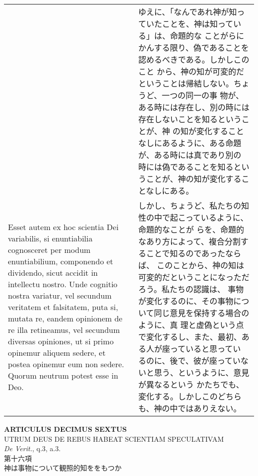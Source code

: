 \documentclass[10pt]{jsarticle} %
\begin{document}
\begin{longtable}{p{21em}p{21em}}
&

ゆえに、「なんであれ神が知っていたことを、神は知っている」は、命題的な
ことがらにかんする限り、偽であることを認めるべきである。しかしこのこと
から、神の知が可変的だということは帰結しない。ちょうど、一つの同一の事
物が、ある時には存在し、別の時には存在しないことを知るということが、神
の知が変化することなしにあるように、ある命題が、ある時には真であり別の
時には偽であることを知るということが、神の知が変化することなしにある。

\\


Esset autem ex hoc scientia Dei variabilis, si enuntiabilia
cognosceret per modum enuntiabilium, componendo et dividendo, sicut
accidit in intellectu nostro. Unde cognitio nostra variatur, vel
secundum veritatem et falsitatem, puta si, mutata re, eandem opinionem
de re illa retineamus, vel secundum diversas opiniones, ut si primo
opinemur aliquem sedere, et postea opinemur eum non sedere. Quorum
neutrum potest esse in Deo.

&

しかし、ちょうど、私たちの知性の中で起こっているように、命題的なことが
らを、命題的なあり方によって、複合分割することで知るのであったならば、
このことから、神の知は可変的だということになっただろう。私たちの認識は、
事物が変化するのに、その事物について同じ意見を保持する場合のように、真
理と虚偽という点で変化するし、また、最初、ある人が座っていると思ってい
るのに、後で、彼が座っていないと思う、というように、意見が異なるという
かたちでも、変化する。しかしこのどちらも、神の中ではありえない。


\end{longtable}
\newpage




\begin{center}
{\Large {\bf ARTICULUS DECIMUS SEXTUS}}\\ {\large UTRUM DEUS DE REBUS
HABEAT SCIENTIAM SPECULATIVAM}\\ {\footnotesize {\itshape De Verit.},
q.3, a.3.}\\ {\Large 第十六項\\神は事物について観照的知ををもつか}
\end{center}
\end{document}
